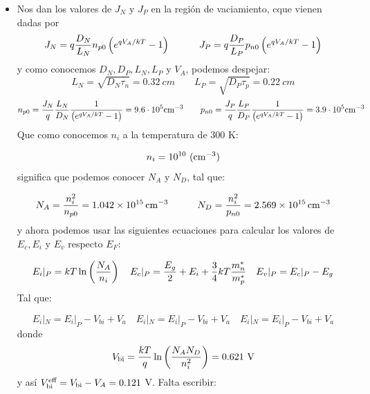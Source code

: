 \begin{itemize}
    \item Nos dan los valores de $J_N$ y $J_P$ en la región de vaciamiento, cque vienen dadas por
    \begin{equation*}
        J_N = q \frac{D_N}{L_N} n_{p0} \left( e^{qV_A/kT}-1 \right)      \quad \quad \quad    J_P = q \frac{D_P}{L_P} p_{n0} \left( e^{qV_A/kT}-1 \right)
    \end{equation*}
    y como conocemos $D_N,D_P,L_N,L_P$ y $V_A$, podemos despejar:
    \begin{equation}
        L_N = \sqrt{D_N \tau_n} = 0.32 \ \unit{cm} \qquad L_P = \sqrt{D_P \tau_p } = 0.22 \ \unit{cm}
    \end{equation}
    \begin{equation*}
        n_{p0} = \frac{J_N}{q} \frac{L_N}{D_N} \frac{1}{\left( e^{qV_A/kT}-1 \right) } = 9.6\cdot 10^5 \text{cm}^{-3} \qquad p_{n0} = \frac{J_P}{q} \frac{L_P}{D_P} \frac{1}{\left( e^{qV_A/kT}-1 \right) }     = 3.9\cdot 10^5 \text{cm}^{-3} 
    \end{equation*}
    Que como conocemos $n_i$ a la temperatura de 300 K:
    
    \begin{equation*}
        n_i = 10^{10} \ (\text{cm}^{-3})
    \end{equation*}
    significa que podemos conocer $N_A$ y $N_D$, tal que:

    \begin{equation*}
        N_A = \frac{n_i^2}{n_{p0}} = \SI{1.042e+15}{cm^{-3}} \quad \quad \quad N_D = \frac{n_i^2}{p_{n0}} = \SI{2.569e+15}{cm^{-3}} 
    \end{equation*}
    y ahora podemos usar las siguientes ecuaciones para calcular los valores de $E_c,E_i$ y $E_v$ respecto $E_F$: 

    \begin{equation*}
        E_i |_P =  kT \ln \left( \frac{N_A}{n_i} \right) \quad E_c |_P = \frac{E_g}{2} + E_i + \frac{3}{4}kT \frac{m_n^*}{m_p^*} \quad E_v|_P = E_c|_P - E_g
    \end{equation*}
    Tal que:

    \begin{equation*}
        E_i|_N = E_i|_P - V_{bi} +V_a  \quad E_i|_N = E_i|_P - V_{bi} + V_a \quad E_i|_N = E_i|_P - V_{bi} +V_a
    \end{equation*}
    donde 
    \begin{equation*}
        \Vbi = \frac{kT}{q} \ln \parentesis{\frac{N_A N_D}{n_i^2}}  = 0.621 \ \unit{V}
    \end{equation*}       
    y así $V_{\text{bi}}^\text{eff} = V_{\text{bi}} - V_A = 0.121$ V. Falta escribir:
    

\end{itemize}

